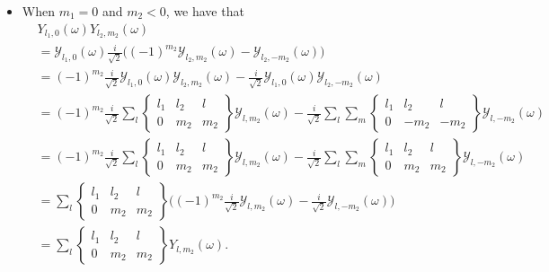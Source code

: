\documentclass[10pt]{article}
\begin{document}
\begin{itemize}
		\item When $m_1 = 0$  and $m_2 < 0$, we have that
		\begin{align*}
			& Y_{l_1, 0}(\omega) Y_{l_2, m_2}(\omega)\\
			&= \mathcal{Y}_{l_1, 0}(\omega) \frac{i}{\sqrt{2}} \bigg( (-1)^{m_2} \mathcal{Y}_{l_2, m_2}(\omega) - \mathcal{Y}_{l_2, -m_2}(\omega) \bigg) \\
			&= (-1)^{m_2} \frac{i}{\sqrt{2}} \mathcal{Y}_{l_1, 0}(\omega) \mathcal{Y}_{l_2, m_2}(\omega) - 
			\frac{i}{\sqrt{2}} \mathcal{Y}_{l_1, 0}(\omega) \mathcal{Y}_{l_2, -m_2}(\omega) \\
			&= (-1)^{m_2} \frac{i}{\sqrt{2}} \sum_l \begin{Bmatrix}
				l_1 & l_2 & l \\ 0 & m_2 & m_2
			\end{Bmatrix} \mathcal{Y}_{l,m_2}(\omega) 
			- \frac{i}{\sqrt{2}} \sum_l \sum_m \begin{Bmatrix}
				l_1 & l_2 & l \\ 0 & -m_2 & -m_2
			\end{Bmatrix} \mathcal{Y}_{l,-m_2}(\omega) \\
			&= (-1)^{m_2} \frac{i}{\sqrt{2}} \sum_l \begin{Bmatrix}
				l_1 & l_2 & l \\ 0 & m_2 & m_2
			\end{Bmatrix} \mathcal{Y}_{l,m_2}(\omega) 
			- \frac{i}{\sqrt{2}} \sum_l \sum_m \begin{Bmatrix}
				l_1 & l_2 & l \\ 0 & m_2 & m_2
			\end{Bmatrix} \mathcal{Y}_{l,-m_2}(\omega) \\
			&= \sum_l \begin{Bmatrix}
				l_1 & l_2 & l \\ 0 & m_2 & m_2
			\end{Bmatrix}
			\bigg( (-1)^{m_2} \frac{i}{\sqrt{2}}  \mathcal{Y}_{l,m_2}(\omega) - \frac{i}{\sqrt{2}} \mathcal{Y}_{l,-m_2}(\omega)  \bigg)\\
			&= \sum_l \begin{Bmatrix}
				l_1 & l_2 & l \\ 0 & m_2 & m_2
			\end{Bmatrix}
			Y_{l,m_2}(\omega).
		\end{align*}


\end{itemize}
\end{document}
